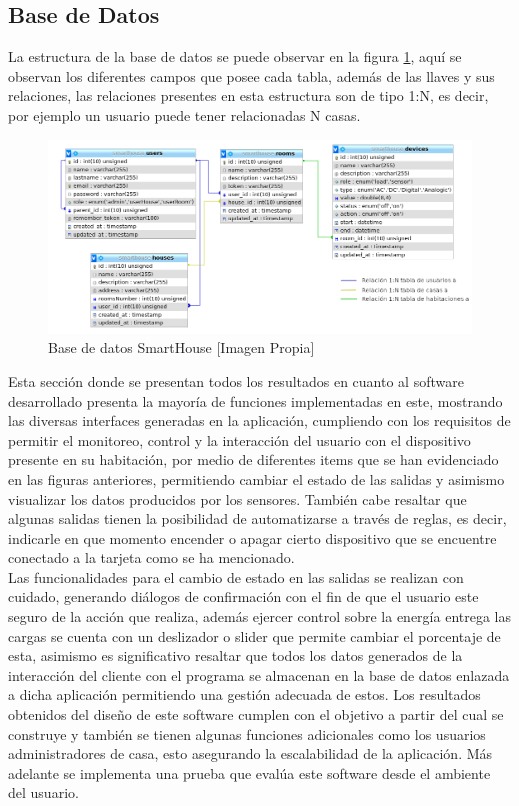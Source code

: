 \subsection{Base de Datos}

La estructura de la base de datos se puede observar en la figura \ref{fig:db}, aquí se observan los diferentes campos que posee cada tabla, además de las llaves y sus relaciones, las relaciones presentes en esta estructura son de tipo 1:N, es decir, por ejemplo un usuario puede tener relacionadas N casas.\\

\begin{figure}[H]
\centering
\caption{Base de datos SmartHouse [Imagen Propia]}
\label{fig:db}
\includegraphics[width=0.75\linewidth]{Imagenes/DB}
\end{figure}

Esta sección donde se presentan todos los resultados en cuanto al software desarrollado presenta la mayoría de funciones implementadas en este, mostrando las diversas interfaces generadas en la aplicación, cumpliendo con los requisitos de permitir el monitoreo, control y la interacción del usuario con el dispositivo presente en su habitación, por medio de diferentes items que se han evidenciado en las figuras anteriores, permitiendo cambiar el estado de las salidas y asimismo visualizar los datos producidos por los sensores. También cabe resaltar que algunas salidas tienen la posibilidad de automatizarse a través de reglas, es decir, indicarle en que momento encender o apagar cierto dispositivo que se encuentre conectado a la tarjeta como se ha mencionado.\\

Las funcionalidades para el cambio de estado en las salidas se realizan con cuidado, generando diálogos de confirmación con el fin de que el usuario este seguro de la acción que realiza, además ejercer control sobre la energía entrega las cargas se cuenta con un deslizador o slider que permite cambiar el porcentaje de esta, asimismo es significativo resaltar que todos los datos generados de la interacción del cliente con el programa se almacenan en la base de datos enlazada a dicha aplicación permitiendo una gestión adecuada de estos. Los resultados obtenidos del diseño de este software cumplen con el objetivo a partir del cual se construye y también se tienen algunas funciones adicionales como los usuarios administradores de casa, esto asegurando la escalabilidad de la aplicación. Más adelante se implementa una prueba que evalúa este software desde el ambiente del usuario.\\

